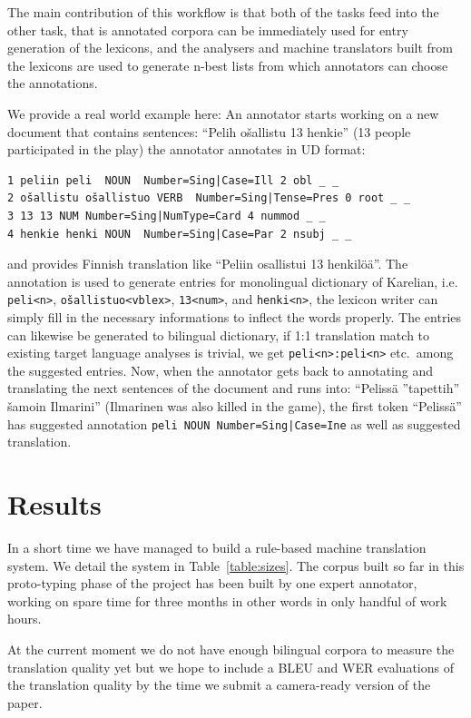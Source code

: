 \documentclass{flammie}
\begin{document}
The main contribution of this workflow is that both of the tasks feed into
the other task, that is annotated corpora can be immediately used for entry
generation of the lexicons, and the analysers and machine translators
built from the lexicons are used to generate n-best lists from which annotators
can choose the annotations.

We provide a real world example here: An annotator starts working on a new
document that contains sentences: ``Pelih ošallistu 13 henkie'' (13 people
participated in the play) the annotator annotates in UD format:
\begin{scriptsize}
\begin{verbatim}
1 peliin peli  NOUN  Number=Sing|Case=Ill 2 obl _ _
2 ošallistu ošallistuo VERB  Number=Sing|Tense=Pres 0 root _ _
3 13 13 NUM Number=Sing|NumType=Card 4 nummod _ _
4 henkie henki NOUN  Number=Sing|Case=Par 2 nsubj _ _
\end{verbatim}
\end{scriptsize}
and provides Finnish translation like ``Peliin
osallistui 13 henkilöä''.  The annotation is used to generate entries for
monolingual dictionary of Karelian, i.e. \verb|peli<n>|,
\verb|ošallistuo<vblex>|, \verb|13<num>|, and \verb|henki<n>|, the lexicon
writer can simply fill in the necessary informations to inflect the words
properly. The entries can likewise be generated to bilingual dictionary, if 1:1
translation match to existing target language analyses is trivial, we get
\verb|peli<n>:peli<n>| etc.\ among the suggested entries. Now, when the
annotator gets back to annotating and translating the next sentences of the
document and runs into: ``Pelissä ”tapettih” šamoin Ilmarini'' (Ilmarinen was
also killed in the game), the first token ``Pelissä'' has suggested annotation
\texttt{peli NOUN Number=Sing|Case=Ine} as well as suggested translation.


\section{Results}\label{sec:results}

In a short time we have managed to build a rule-based machine translation
system. We detail the system in Table~\ref{table:sizes}. The corpus built
so far in this proto-typing phase of the project has been built by one
expert annotator, working on spare time for three months in other words in
only handful of work hours.

At the current moment we do not have enough bilingual corpora to measure the
translation quality yet but we hope to include a BLEU and WER evaluations of
the translation quality by the time we submit a camera-ready version of the
paper.
\end{document}
